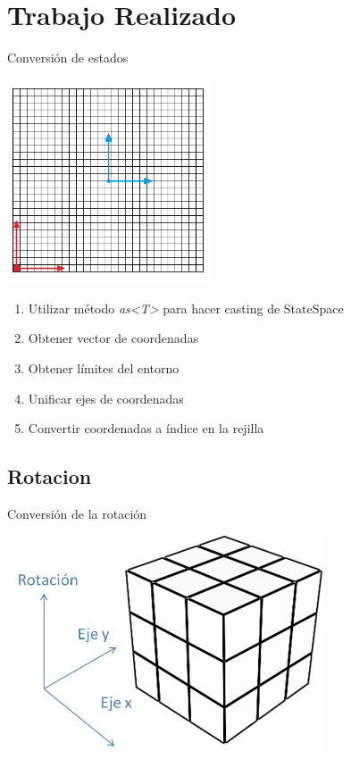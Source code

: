 \documentclass[10pt]{beamer}
\begin{document}
\section{Trabajo Realizado}

\begin{frame}{Conversión de estados}
	\begin{multicols}{2}
		\includegraphics[width=0.45\textwidth,keepaspectratio]{ejes}	
		\begin{enumerate}
			\item Utilizar método \textit{as<T>} para hacer casting de StateSpace
			\item Obtener vector de coordenadas
			\item Obtener límites del entorno
			\item Unificar ejes de coordenadas
			\item Convertir coordenadas a índice en la rejilla
		\end{enumerate}
	\end{multicols}
\end{frame}

\subsection{Rotacion}
\begin{frame}{Conversión de la rotación}
	\begin{center}
	\includegraphics[width=0.7\textwidth,height=0.6\textheight,keepaspectratio]{rotacion}	
	\end{center}
\end{frame}
\end{document}
